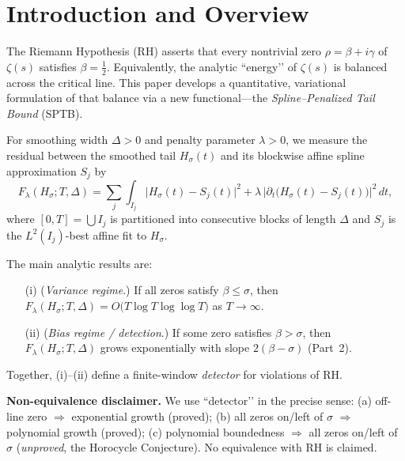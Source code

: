 
\section{Introduction and Overview}

The Riemann Hypothesis (RH) asserts that every nontrivial zero 
$\rho = \beta + i\gamma$ of $\zeta(s)$ satisfies $\beta = \tfrac12$.
Equivalently, the analytic “energy’’ of $\zeta(s)$ is balanced across the
critical line.  This paper develops a quantitative, variational formulation
of that balance via a new functional—the
\emph{Spline–Penalized Tail Bound} (SPTB).  

For smoothing width $\Delta>0$ and penalty parameter $\lambda>0$, we measure
the residual between the smoothed tail $H_\sigma(t)$ and its blockwise affine spline
approximation $S_j$ by
\begin{equation}
F_\lambda(H_\sigma;T,\Delta)
  = \sum_{j}\!\int_{I_j}
       \bigl|H_\sigma(t)-S_j(t)\bigr|^2
       + \lambda\,\bigl|\partial_t\!\bigl(H_\sigma(t)-S_j(t)\bigr)\bigr|^2\,dt,
\label{eq:SPTB}
\tag{1.1}
\end{equation}
where $[0,T] = \bigcup I_j$ is partitioned into consecutive blocks of length $\Delta$ and
$S_j$ is the $L^2(I_j)$-best affine fit to $H_\sigma$.

The main analytic results are:
\begin{itemize}
\item[(i)] (\emph{Variance regime}.) If all zeros satisfy $\beta\le\sigma$, then
$F_\lambda(H_\sigma;T,\Delta)=O\!\bigl(T\log T\log\log T\bigr)$ as $T\to\infty$.
\item[(ii)] (\emph{Bias regime / detection}.) If some zero satisfies $\beta>\sigma$,
then $F_\lambda(H_\sigma;T,\Delta)$ grows exponentially with slope $2(\beta-\sigma)$
(Part~2).
\end{itemize}
Together, (i)–(ii) define a finite-window \emph{detector} for violations of RH.

\medskip
\noindent\textbf{Non-equivalence disclaimer.}
We use “detector’’ in the precise sense:
(a) off-line zero $\Rightarrow$ exponential growth (proved);
(b) all zeros on/left of $\sigma$ $\Rightarrow$ polynomial growth (proved);
(c) polynomial boundedness $\Rightarrow$ all zeros on/left of $\sigma$
(\emph{unproved}, the Horocycle Conjecture).  No equivalence with RH is claimed.

